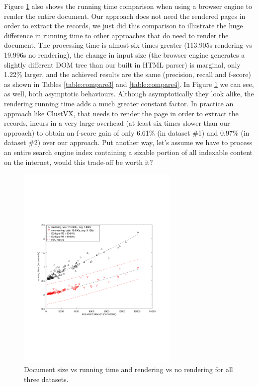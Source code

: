 Figure \ref{fig:runtime} also shows the running time comparison when using a
browser engine to render the entire document. Our approach does not need the
rendered pages in order to extract the records, we just did this comparison to
illustrate the huge difference in running time to other approaches that do need
to render the document. The processing time is almost six times greater
(113.905s rendering vs 19.996s no rendering), the change in input size (the
browser engine generates a slightly different DOM tree than our built in HTML
parser) is marginal, only 1.22\% larger, and the achieved results are the
same (precision, recall and f-score) as shown in Tables \ref{table:compare3}
and \ref{table:compare4}. In Figure \ref{fig:runtime} we can see, as well, both
asymptotic behaviours.
Although asymptotically they look alike, the rendering running time adds a much
greater constant factor. In practice an approach like ClustVX, that needs to
render the page in order to extract the records, incurs in a very large overhead
(at least six times slower than our approach) to obtain an f-score gain of only
6.61\% (in dataset \#1) and 0.97\% (in dataset \#2) over our approach. Put
another way, let's assume we have to process an entire search engine index
containing a sizable portion of all indexable content on the internet, would
this trade-off be worth it?


\begin{figure}[h]
  \centering
     \includegraphics[trim={2.5cm 7.5cm 1cm 6.5cm}, width=220pt
     ]{img/runtime.pdf}
  \caption{\small{Document size vs running time and rendering vs no rendering for all three datasets.}}
  \label{fig:runtime}
\end{figure}

